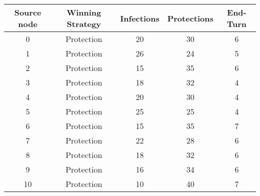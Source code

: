 \documentclass[results.tex]{subfiles}
\begin{document}
    \begin{center}
        \begin{tabular}{| c || c | c | c | c |}
            \hline
            {\bfseries Source node} & {\bfseries Winning Strategy} & {\bfseries Infections} & {\bfseries Protections}
            & {\bfseries End-Turn}
            \\  %
            \hline\hline
            0                       & Protection                   & 20                     & 30                      & 6                    \\
            \hline
            1                       & Protection                   & 26                     & 24                      & 5                    \\
            \hline
            2                       & Protection                   & 15                     & 35                      & 6                    \\
            \hline
            3                       & Protection                   & 18                     & 32                      & 4                    \\
            \hline
            4                       & Protection                   & 20                     & 30                      & 4                    \\
            \hline
            5                       & Protection                   & 25                     & 25                      & 4                    \\
            \hline
            6                       & Protection                   & 15                     & 35                      & 7                    \\
            \hline
            7                       & Protection                   & 22                     & 28                      & 6                    \\
            \hline
            8                       & Protection                   & 18                     & 32                      & 6                    \\
            \hline
            9                       & Protection                   & 16                     & 34                      & 6                    \\
            \hline
            10                      & Protection                   & 10                     & 40                      & 7                    \\

\end{tabular}
\end{center}
\end{document}
